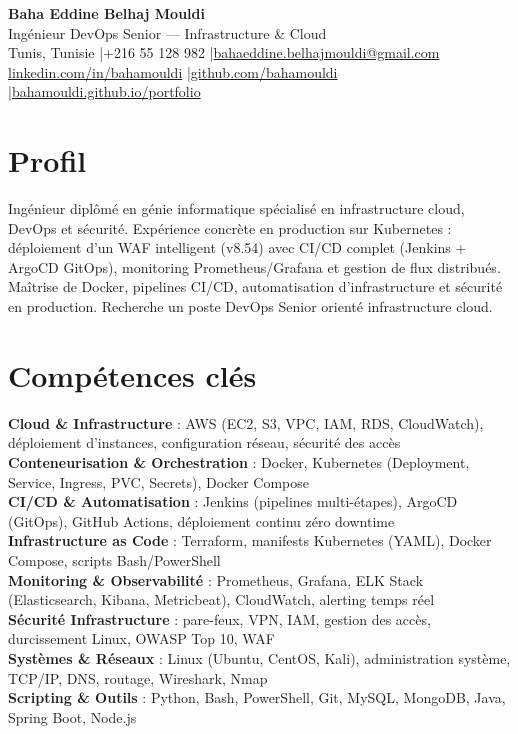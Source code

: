 \documentclass[a4paper,8pt]{article}
\begin{document}
\begin{center}
{\LARGE\bfseries\color{navy} Baha Eddine Belhaj Mouldi}\\[1pt]
{\large Ingénieur DevOps Senior — Infrastructure \& Cloud}\\[3pt]
Tunis, Tunisie \quad|\quad +216 55 128 982 \quad|\quad \href{mailto:bahaeddine.belhajmouldi@gmail.com}{bahaeddine.belhajmouldi@gmail.com}\\[1pt]
\href{https://www.linkedin.com/in/bahamouldi}{linkedin.com/in/bahamouldi} \quad|\quad \href{https://github.com/bahamouldi}{github.com/bahamouldi} \quad|\quad \href{https://bahamouldi.github.io/portfolio/}{bahamouldi.github.io/portfolio}
\end{center}
\vspace{0pt}
\section{Profil}
Ingénieur diplômé en génie informatique spécialisé en infrastructure cloud, DevOps et sécurité. Expérience concrète en production sur Kubernetes : déploiement d'un WAF intelligent (v8.54) avec CI/CD complet (Jenkins + ArgoCD GitOps), monitoring Prometheus/Grafana et gestion de flux distribués. Maîtrise de Docker, pipelines CI/CD, automatisation d'infrastructure et sécurité en production. Recherche un poste DevOps Senior orienté infrastructure cloud.
\section{Compétences clés}
\textbf{Cloud \& Infrastructure} : AWS (EC2, S3, VPC, IAM, RDS, CloudWatch), déploiement d'instances, configuration réseau, sécurité des accès\\[0.3pt]
\textbf{Conteneurisation \& Orchestration} : Docker, Kubernetes (Deployment, Service, Ingress, PVC, Secrets), Docker Compose\\[0.3pt]
\textbf{CI/CD \& Automatisation} : Jenkins (pipelines multi-étapes), ArgoCD (GitOps), GitHub Actions, déploiement continu zéro downtime\\[0.3pt]
\textbf{Infrastructure as Code} : Terraform, manifests Kubernetes (YAML), Docker Compose, scripts Bash/PowerShell\\[0.3pt]
\textbf{Monitoring \& Observabilité} : Prometheus, Grafana, ELK Stack (Elasticsearch, Kibana, Metricbeat), CloudWatch, alerting temps réel\\[0.3pt]
\textbf{Sécurité Infrastructure} : pare-feux, VPN, IAM, gestion des accès, durcissement Linux, OWASP Top 10, WAF\\[0.3pt]
\textbf{Systèmes \& Réseaux} : Linux (Ubuntu, CentOS, Kali), administration système, TCP/IP, DNS, routage, Wireshark, Nmap\\[0.3pt]
\textbf{Scripting \& Outils} : Python, Bash, PowerShell, Git, MySQL, MongoDB, Java, Spring Boot, Node.js
\end{document}
